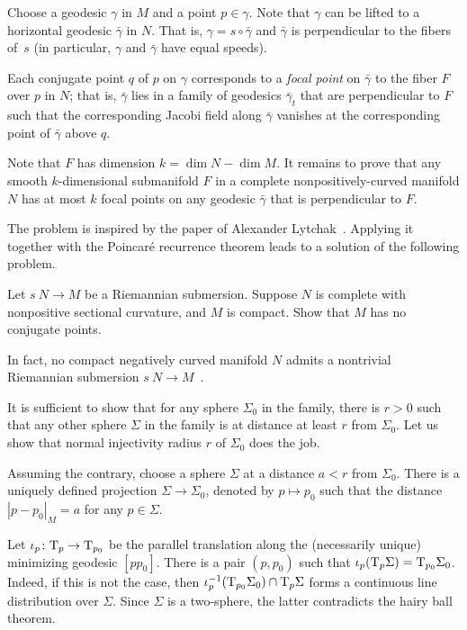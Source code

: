 Choose a geodesic $\gamma$ in $M$ and a point $p\in \gamma$.
Note that $\gamma$ can be lifted to a horizontal geodesic $\bar\gamma$ in $N$.
That is, $\gamma=s\circ\bar\gamma$ and $\bar\gamma$ is perpendicular to the fibers of~$s$ (in particular, $\gamma$ and $\bar\gamma$ have equal speeds).

Each conjugate point $q$ of $p$ on $\gamma$ corresponds to a \emph{focal point} on $\bar\gamma$ to the fiber $F$ over $p$ in $N$;
that is, $\bar\gamma$ lies in a family of geodesics $\bar\gamma_t$ that are perpendicular to $F$
such that the corresponding Jacobi field along $\bar\gamma$ vanishes at the corresponding point of $\bar\gamma$ above $q$.

Note that $F$ has dimension $k=\dim N-\dim M$.
It remains to prove that any smooth $k$-dimensional submanifold $F$ in a complete nonpositively-curved manifold $N$ has at most $k$ focal points on any geodesic $\bar \gamma$ that is perpendicular to $F$.\qeds

The problem is inspired by the paper of Alexander Lytchak~\cite{lytchak:conjugate}.
Applying it together with the Poincaré recurrence theorem
leads to a solution of the following problem.

\begin{pr}
Let $s\:N\to M$ be a Riemannian submersion.
Suppose $N$ is complete with nonpositive sectional curvature, and $M$ is compact.
Show that $M$ has no conjugate points.
\end{pr}

In fact, no compact negatively curved manifold $N$ admits a nontrivial Riemannian submersion $s\:N\to M$~\cite[see Theorem F in][]{zeghib}. 





It is sufficient to show that for any sphere $\Sigma_0$ in the family, there is $r>0$ such that any other sphere $\Sigma$ in the family is at distance at least $r$ from $\Sigma_0$.
Let us show that normal injectivity radius $r$ of $\Sigma_0$ does the job.

Assuming the contrary, choose a sphere $\Sigma$ at a distance $a<r$ from $\Sigma_0$.
There is a uniquely defined projection $\Sigma\to \Sigma_0$, denoted by $p\mapsto p_0$ such that the distance $|p-p_0|_M=a$ for any $p\in\Sigma$.

Let $\iota_p\colon\mathrm{T}_p\to\mathrm{T}_{p_0}$ be the parallel translation along the (necessarily unique) minimizing geodesic $[pp_0]$.
There is a pair $(p,p_0)$ such that $\iota_p(\mathrm{T}_p\Sigma)=\mathrm{T}_{p_0}\Sigma_0$.
Indeed, if this is not the case, then $\iota_p^{-1}(\T_{p_0}\Sigma_0)\z\cap\T_{p}\Sigma$ forms a continuous line distribution over $\Sigma$.
Since $\Sigma$ is a two-sphere, the latter contradicts the hairy ball theorem.

